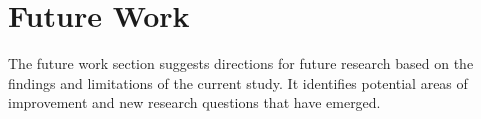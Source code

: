 \section{Future Work}
\label{section:future}
The future work section suggests directions for future research based on the findings and limitations of the current study. It identifies potential areas of improvement and new research questions that have emerged.